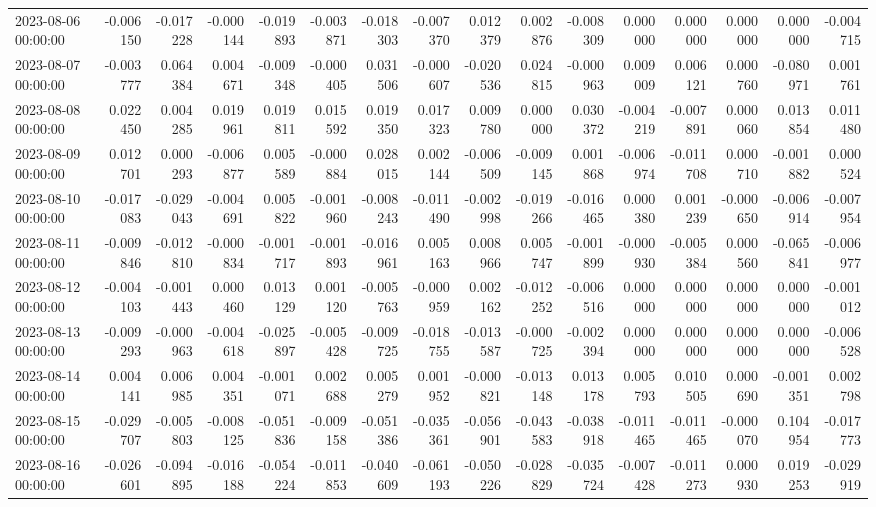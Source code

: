\begin{tabular}{lrrrrrrrrrrrrrrr}
2023-08-06 00:00:00 & -0.006150 & -0.017228 & -0.000144 & -0.019893 & -0.003871 & -0.018303 & -0.007370 & 0.012379 & 0.002876 & -0.008309 & 0.000000 & 0.000000 & 0.000000 & 0.000000 & -0.004715 \\
2023-08-07 00:00:00 & -0.003777 & 0.064384 & 0.004671 & -0.009348 & -0.000405 & 0.031506 & -0.000607 & -0.020536 & 0.024815 & -0.000963 & 0.009009 & 0.006121 & 0.000760 & -0.080971 & 0.001761 \\
2023-08-08 00:00:00 & 0.022450 & 0.004285 & 0.019961 & 0.019811 & 0.015592 & 0.019350 & 0.017323 & 0.009780 & 0.000000 & 0.030372 & -0.004219 & -0.007891 & 0.000060 & 0.013854 & 0.011480 \\
2023-08-09 00:00:00 & 0.012701 & 0.000293 & -0.006877 & 0.005589 & -0.000884 & 0.028015 & 0.002144 & -0.006509 & -0.009145 & 0.001868 & -0.006974 & -0.011708 & 0.000710 & -0.001882 & 0.000524 \\
2023-08-10 00:00:00 & -0.017083 & -0.029043 & -0.004691 & 0.005822 & -0.001960 & -0.008243 & -0.011490 & -0.002998 & -0.019266 & -0.016465 & 0.000380 & 0.001239 & -0.000650 & -0.006914 & -0.007954 \\
2023-08-11 00:00:00 & -0.009846 & -0.012810 & -0.000834 & -0.001717 & -0.001893 & -0.016961 & 0.005163 & 0.008966 & 0.005747 & -0.001899 & -0.000930 & -0.005384 & 0.000560 & -0.065841 & -0.006977 \\
2023-08-12 00:00:00 & -0.004103 & -0.001443 & 0.000460 & 0.013129 & 0.001120 & -0.005763 & -0.000959 & 0.002162 & -0.012252 & -0.006516 & 0.000000 & 0.000000 & 0.000000 & 0.000000 & -0.001012 \\
2023-08-13 00:00:00 & -0.009293 & -0.000963 & -0.004618 & -0.025897 & -0.005428 & -0.009725 & -0.018755 & -0.013587 & -0.000725 & -0.002394 & 0.000000 & 0.000000 & 0.000000 & 0.000000 & -0.006528 \\
2023-08-14 00:00:00 & 0.004141 & 0.006985 & 0.004351 & -0.001071 & 0.002688 & 0.005279 & 0.001952 & -0.000821 & -0.013148 & 0.013178 & 0.005793 & 0.010505 & 0.000690 & -0.001351 & 0.002798 \\
2023-08-15 00:00:00 & -0.029707 & -0.005803 & -0.008125 & -0.051836 & -0.009158 & -0.051386 & -0.035361 & -0.056901 & -0.043583 & -0.038918 & -0.011465 & -0.011465 & -0.000070 & 0.104954 & -0.017773 \\
2023-08-16 00:00:00 & -0.026601 & -0.094895 & -0.016188 & -0.054224 & -0.011853 & -0.040609 & -0.061193 & -0.050226 & -0.028829 & -0.035724 & -0.007428 & -0.011273 & 0.000930 & 0.019253 & -0.029919 \\

\end{tabular}
